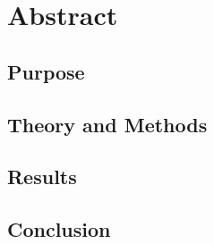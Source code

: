 \section{Abstract}

\subsection{Purpose}

\lipsum[2]

\subsection{Theory and Methods}

\lipsum[2]

\subsection{Results}

\lipsum[2]

\subsection{Conclusion}

\lipsum[2]

\clearpage
